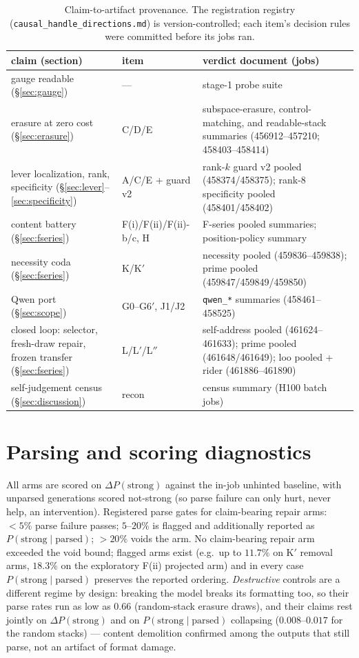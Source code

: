 \documentclass{article} %
\begin{document}
\begin{table}[h]
\centering\small
\begin{tabular}{@{}p{4.2cm}lp{5.2cm}@{}}
\toprule
claim (section) & item & verdict document (jobs) \\
\midrule
gauge readable (\S\ref{sec:gauge}) & --- & stage-1 probe suite \\
erasure at zero cost (\S\ref{sec:erasure}) & C/D/E & subspace-erasure, control-matching, and readable-stack summaries (456912--457210; 458403--458414) \\
lever localization, rank, specificity (\S\ref{sec:lever}--\ref{sec:specificity}) & A/C/E + guard v2 & rank-$k$ guard v2 pooled (458374/458375); rank-8 specificity pooled (458401/458402) \\
content battery (\S\ref{sec:fseries}) & F(i)/F(ii)/F(ii)-b/c, H & F-series pooled summaries; position-policy summary \\
necessity coda (\S\ref{sec:fseries}) & K/K$'$ & necessity pooled (459836--459838); prime pooled (459847/459849/459850) \\
Qwen port (\S\ref{sec:scope}) & G0--G6$'$, J1/J2 & \texttt{qwen\_*} summaries (458461--458525) \\
closed loop: selector, fresh-draw repair, frozen transfer (\S\ref{sec:fseries}) & L/L$'$/L$''$ & self-address pooled (461624--461633); prime pooled (461648/461649); loo pooled + rider (461886--461890) \\
self-judgement census (\S\ref{sec:discussion}) & recon & census summary (H100 batch jobs) \\
\bottomrule
\end{tabular}
\caption{Claim-to-artifact provenance. The registration registry
(\texttt{causal\_handle\_directions.md}) is version-controlled; each item's
decision rules were committed before its jobs ran.}
\label{tab:provenance}
\end{table}

\section{Parsing and scoring diagnostics}\label{app:parse}

All arms are scored on $\Delta P(\text{strong})$ against the in-job
unhinted baseline, with unparsed generations scored not-strong (so parse
failure can only hurt, never help, an intervention). Registered parse
gates for claim-bearing repair arms: $<5\%$ parse failure passes;
$5$--$20\%$ is flagged and
additionally reported as $P(\text{strong}\mid\text{parsed})$; $>20\%$
voids the arm. No claim-bearing repair arm exceeded the void bound;
flagged arms exist (e.g.\ up to $11.7\%$ on K$'$ removal arms, $18.3\%$
on the exploratory F(ii) projected arm) and in every case
$P(\text{strong}\mid\text{parsed})$ preserves the reported ordering.
\emph{Destructive} controls are a different regime by design: breaking
the model breaks its formatting too, so their parse rates run as low
as $0.66$ (random-stack erasure draws), and their claims rest jointly
on $\Delta P(\text{strong})$ and on
$P(\text{strong}\mid\text{parsed})$ collapsing ($0.008$--$0.017$ for
the random stacks) --- content demolition confirmed among the outputs
that still parse, not an artifact of format damage.
\end{document}
